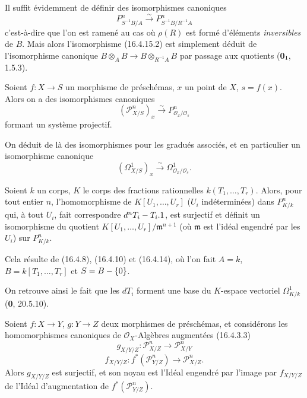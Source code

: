 Il suffit évidemment de définir des isomorphismes canoniques
\[
  P_{S^{-1}B/A}^n\xrightarrow{\sim}P_{S^{-1}B/R^{-1}A}^n
  \tag{16.4.15.2}
  \label{IV.16.4.15.2}
\]
c'est-à-dire que l'on est ramené au cas où $\rho(R)$ est formé d'éléments
\emph{inversibles} de $B$. Mais alors l'isomorphisme (16.4.15.2) est simplement
déduit de l'isomorphisme canonique
$B\otimes_A B\to B\otimes_{R^{-1}A}B$ par passage aux quotients
(\textbf{0}$_{\rm I}$, 1.5.3).

\begin{corollary}[16.4.16]
\label{IV.16.4.16}
Soient $f:X\to S$ un morphisme de préschémas, $x$ un point de $X$,
$s=f(x)$. Alors on a des isomorphismes canoniques
\[
  (\mathscr{P}_{X/S}^n)_x\xrightarrow{\sim}
  P_{\mathcal{O}_x/\mathcal{O}_s}^n
  \tag{16.4.16.1}
  \label{IV.16.4.16.1}
\]
formant un système projectif.
\end{corollary}

On déduit de là des isomorphismes pour les gradués associés, et en particulier
un isomorphisme canonique
\[
  (\varOmega_{X/S}^1)_x\xrightarrow{\sim}
  \Omega_{\mathcal{O}_x/\mathcal{O}_s}^1.
  \tag{16.4.16.2}
  \label{IV.16.4.16.2}
\]

\begin{corollary}[16.4.17]
\label{IV.16.4.17}
Soient $k$ un corps, $K$ le corps des fractions rationnelles
$k(T_1,\ldots,T_r)$. Alors, pour tout entier $n$, l'homomorphisme de
$K[U_1,\ldots,U_r]$ ($U_i$ indéterminées) dans $P_{K/k}^n$ qui, à tout $U_i$,
fait correspondre $d^nT_i- T_i.1$, est surjectif et définit un isomorphisme
du quotient $K[U_1,\ldots,U_r]/\mathfrak{m}^{n+1}$ (où $\mathfrak{m}$ est
l'idéal engendré par les $U_i$) sur $P_{K/k}^n$.
\end{corollary}

Cela résulte de (16.4.8), (16.4.10) et (16.4.14), où l'on fait $A=k$,
$B=k[T_1,\ldots,T_r]$ et $S=B-\{0\}$.

On retrouve ainsi le fait que les $dT_i$ forment une base du $K$-espace
vectoriel $\Omega_{K/k}^1$ (\textbf{0}, 20.5.10).

\begin{proposition}[16.4.18]
\label{IV.16.4.18}
Soient $f:X\to Y$, $g:Y\to Z$ deux morphismes de préschémas, et considérons
les homomorphismes canoniques de $\mathcal{O}_X$-Algèbres augmentées
\textup{(16.4.3.3)}
\[
  g_{X/Y/Z}:\mathscr{P}_{X/Z}^n\longrightarrow\mathscr{P}_{X/Y}^n
  \tag{16.4.18.1}
  \label{IV.16.4.18.1}
\]
\[
  f_{X/Y/Z}:f^*(\mathscr{P}_{Y/Z}^n)
  \longrightarrow\mathscr{P}_{X/Z}^n.
  \tag{16.4.18.2}
  \label{IV.16.4.18.2}
\]
Alors $g_{X/Y/Z}$ est surjectif, et son noyau est l'Idéal engendré par l'image
par $f_{X/Y/Z}$ de l'Idéal d'augmentation de
$f^*(\mathscr{P}_{Y/Z}^n)$.
\end{proposition}

